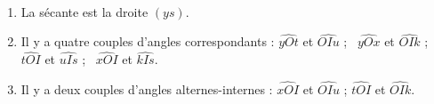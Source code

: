    \ \\ [-5mm]
   \begin{enumerate}
       \item La sécante est {\blue la droite $(ys)$}.
       \item Il y a quatre couples d'angles correspondants : {\blue $\widehat{yOt}$ et $\widehat{OIu}$ ; \, $\widehat{yOx}$ et $\widehat{OIk}$ ; \, $\widehat{tOI}$ et $\widehat{uIs}$ ; \, $\widehat{xOI}$ et $\widehat{kIs}$}.
       \item Il y a deux couples d'angles alternes-internes : {\blue $\widehat{xOI}$ et $\widehat{OIu}$ \quad ; \quad $\widehat{tOI}$ et $\widehat{OIk}$}.
   \end{enumerate}
